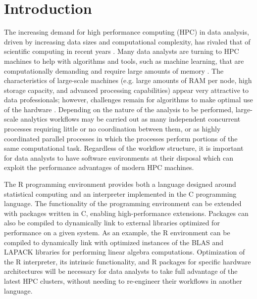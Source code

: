 \section{Introduction}

The increasing demand for high performance computing (HPC) in data analysis, driven by
increasing data sizes and computational complexity, has rivaled that of scientific
computing in recent years \cite{fox:bdBenchmarking, kouzes:paradigm}. Many data analysts
are turning to HPC machines to help with algorithms and tools,
such as machine learning, that are computationally demanding and require large amounts of
memory \cite{raj:hpcBigData}. The characteristics of large-scale machines (e.g. large
amounts of RAM per node, high storage capacity, and advanced processing capabilities)
appear very attractive to data professionals; however, challenges remain for algorithms to
make optimal use of the hardware \cite{lee:model}. Depending on the nature of the analysis
to be performed, large-scale analytics workflows may be carried out as many independent
concurrent processes requiring little or no coordination between them, or as highly coordinated
parallel processes in which the processes perform portions of the same computational task.
Regardless of the workflow structure, it is important for data analysts to have software
environments at their disposal which can exploit the performance advantages of modern HPC
machines.

The R programming environment provides both a language designed around statistical
   computing and an interpreter implemented in the C programming language.
The functionality of the programming environment can be extended with packages written in C,
   enabling high-performance extensions.
Packages can also be compiled to dynamically link to external libraries optimized for
   performance on a given system.
As an example, the R environment can be compiled to
dynamically link with optimized instances of the BLAS \cite{dongarra:1990blas} and LAPACK
\cite{hammarling:1988blas} libraries for performing linear algebra computations.
Optimization of the R interpreter, its intrinsic functionality, and R packages for
specific hardware architectures will be necessary for data analysts to take full advantage
of the latest HPC clusters, without needing to re-engineer their workflows
in another language.

